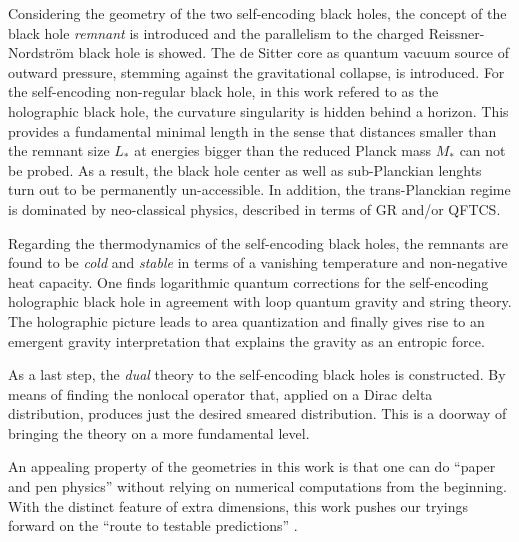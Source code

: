 \documentclass[12pt,a4paper]{report}
\numberwithin{equation}{chapter}
\begin{document}
Considering the geometry of the two self-encoding black holes, the concept of the black hole \emph{remnant} is introduced and the parallelism to the charged Reissner-Nordström black hole is showed. The de Sitter core as quantum vacuum source of outward pressure, stemming against the gravitational collapse, is introduced. For the self-encoding non-regular black hole, in this work refered to as the holographic black hole, the curvature singularity is hidden behind a horizon. This provides a fundamental minimal length in the sense that distances smaller than the remnant size $L_*$ at energies bigger than the reduced Planck mass $M_*$ can not be probed. 
As a result, the black hole center as well as sub-Planckian lenghts turn out to be permanently un-accessible. In addition, the trans-Planckian regime is dominated by neo-classical physics, described in terms of GR and/or QFTCS.

Regarding the thermodynamics of the self-encoding black holes, the remnants are found to be \emph{cold} and \emph{stable} in terms of a vanishing temperature and non-negative heat capacity. One finds logarithmic quantum corrections for the self-encoding holographic black hole in agreement with loop quantum gravity and string theory. The holographic picture leads to area quantization and finally gives rise to an emergent gravity interpretation that explains the gravity as an entropic force.

As a last step, the \emph{dual} theory to the self-encoding black holes is constructed. By means of finding the nonlocal operator that, applied on a Dirac delta distribution, produces just the desired smeared distribution. This is a doorway of bringing the theory on a more fundamental level.

An appealing property of the geometries in this work is that one can do ``paper and pen physics'' without relying on numerical computations from the beginning. With the distinct feature of extra dimensions, this work pushes our tryings forward on the ``route to testable predictions'' \cite{NS2013}. 


\end{document}
